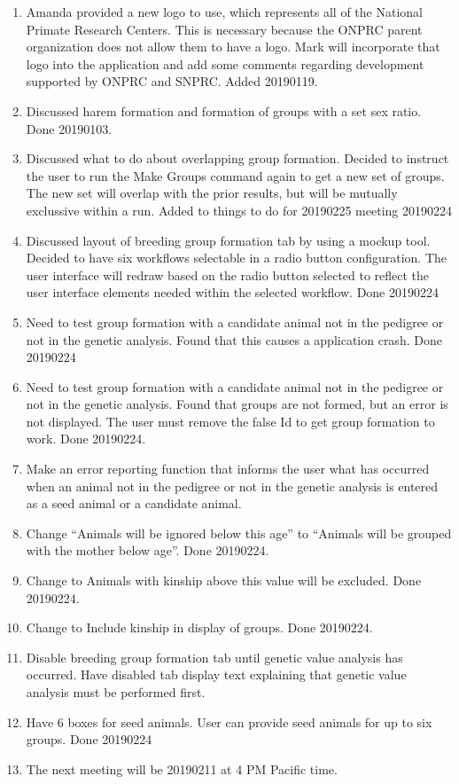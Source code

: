 \documentclass[
]{article}
\begin{document}
\begin{enumerate}
\def\labelenumi{\arabic{enumi}.}
\item
  Amanda provided a new logo to use, which represents all of the
  National Primate Research Centers. This is necessary because the ONPRC
  parent organization does not allow them to have a logo. Mark will
  incorporate that logo into the application and add some comments
  regarding development supported by ONPRC and SNPRC. Added 20190119.
\item
  Discussed harem formation and formation of groups with a set sex
  ratio. Done 20190103.
\item
  Discussed what to do about overlapping group formation. Decided to
  instruct the user to run the Make Groups command again to get a new
  set of groups. The new set will overlap with the prior results, but
  will be mutually exclussive within a run. Added to things to do for
  20190225 meeting 20190224
\item
  Discussed layout of breeding group formation tab by using a mockup
  tool. Decided to have six workflows selectable in a radio button
  configuration. The user interface will redraw based on the radio
  button selected to reflect the user interface elements needed within
  the selected workflow. Done 20190224
\item
  Need to test group formation with a candidate animal not in the
  pedigree or not in the genetic analysis. Found that this causes a
  application crash. Done 20190224
\item
  Need to test group formation with a candidate animal not in the
  pedigree or not in the genetic analysis. Found that groups are not
  formed, but an error is not displayed. The user must remove the false
  Id to get group formation to work. Done 20190224.
\item
  Make an error reporting function that informs the user what has
  occurred when an animal not in the pedigree or not in the genetic
  analysis is entered as a seed animal or a candidate animal.
\item
  Change ``Animals will be ignored below this age'' to ``Animals will be
  grouped with the mother below age''. Done 20190224.
\item
  Change to Animals with kinship above this value will be excluded. Done
  20190224.
\item
  Change to Include kinship in display of groups. Done 20190224.
\item
  Disable breeding group formation tab until genetic value analysis has
  occurred. Have disabled tab display text explaining that genetic value
  analysis must be performed first.
\item
  Have 6 boxes for seed animals. User can provide seed animals for up to
  six groups. Done 20190224
\item
  The next meeting will be 20190211 at 4 PM Pacific time.
\end{enumerate}
\end{document}
